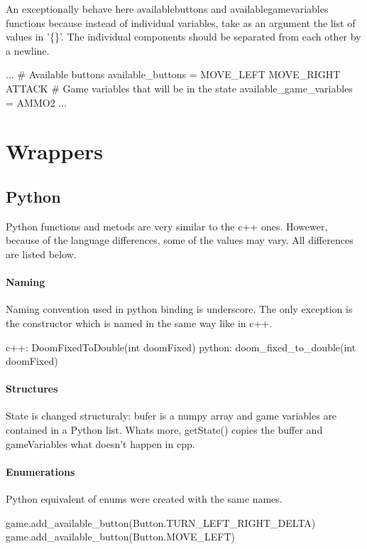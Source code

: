 An exceptionally behave here availablebuttons and availablegamevariables functions because instead of individual variables, take as an argument the list of values in '\{\}'. The individual components should be separated from each other by a newline.
\begin{pblock}
...
# Available buttons
available_buttons = 
	{ 
		MOVE_LEFT 
		MOVE_RIGHT 
		ATTACK 
	}
# Game variables that will be in the state
available_game_variables = { AMMO2}
...
\end{pblock}

\section{Wrappers}
\subsection{Python}

Python functions and metods are very similar to the c++ ones. Howewer, because of the language differences, some of the values may vary. All differences are listed below.

\paragraph {Naming}
Naming convention used in python binding is underscore. The only exception is the constructor which is named in the same way like in c++.

\begin{cblock}
c++: DoomFixedToDouble(int doomFixed)
python: doom_fixed_to_double(int doomFixed)
\end{cblock}


\paragraph {Structures}
 State is changed structuraly: bufer is a numpy array and game variables are contained in a Python list. Whats more, getState() copies the buffer and gameVariables what doesn't happen in cpp. 
\paragraph {Enumerations}
Python equivalent of enums were created with the same names.
\begin{cblock}
game.add_available_button(Button.TURN_LEFT_RIGHT_DELTA)
game.add_available_button(Button.MOVE_LEFT)
\end{cblock}
